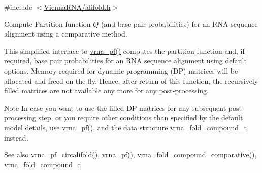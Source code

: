 {\ttfamily \#include $<$\mbox{\hyperlink{alifold_8h}{Vienna\+R\+N\+A/alifold.\+h}}$>$}



Compute Partition function $Q$ (and base pair probabilities) for an R\+NA sequence alignment using a comparative method. 

This simplified interface to \mbox{\hyperlink{group__pf__fold_ga29e256d688ad221b78d37f427e0e99bc}{vrna\+\_\+pf()}} computes the partition function and, if required, base pair probabilities for an R\+NA sequence alignment using default options. Memory required for dynamic programming (DP) matrices will be allocated and free\textquotesingle{}d on-\/the-\/fly. Hence, after return of this function, the recursively filled matrices are not available any more for any post-\/processing.

\begin{DoxyNote}{Note}
In case you want to use the filled DP matrices for any subsequent post-\/processing step, or you require other conditions than specified by the default model details, use \mbox{\hyperlink{group__pf__fold_ga29e256d688ad221b78d37f427e0e99bc}{vrna\+\_\+pf()}}, and the data structure \mbox{\hyperlink{group__fold__compound_ga1b0cef17fd40466cef5968eaeeff6166}{vrna\+\_\+fold\+\_\+compound\+\_\+t}} instead.
\end{DoxyNote}
\begin{DoxySeeAlso}{See also}
\mbox{\hyperlink{group__consensus__pf__fold_gab70fe6c9a78b79cc5669881720926e1d}{vrna\+\_\+pf\+\_\+circalifold()}}, \mbox{\hyperlink{group__pf__fold_ga29e256d688ad221b78d37f427e0e99bc}{vrna\+\_\+pf()}}, \mbox{\hyperlink{group__fold__compound_gad6bacc816af274922b13d947f708aa0c}{vrna\+\_\+fold\+\_\+compound\+\_\+comparative()}}, \mbox{\hyperlink{group__fold__compound_ga1b0cef17fd40466cef5968eaeeff6166}{vrna\+\_\+fold\+\_\+compound\+\_\+t}}
\end{DoxySeeAlso}

